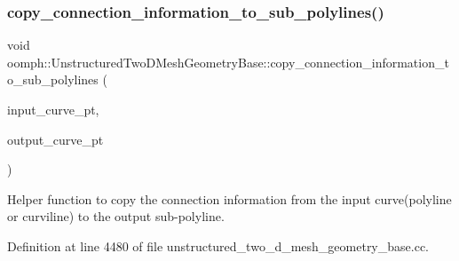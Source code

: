 \subsubsection{\texorpdfstring{copy\+\_\+connection\+\_\+information\+\_\+to\+\_\+sub\+\_\+polylines()}{copy\_connection\_information\_to\_sub\_polylines()}}
{\footnotesize\ttfamily void oomph\+::\+Unstructured\+Two\+D\+Mesh\+Geometry\+Base\+::copy\+\_\+connection\+\_\+information\+\_\+to\+\_\+sub\+\_\+polylines (\begin{DoxyParamCaption}\item[{\hyperlink{classoomph_1_1TriangleMeshCurveSection}{Triangle\+Mesh\+Curve\+Section} $\ast$}]{input\+\_\+curve\+\_\+pt,  }\item[{\hyperlink{classoomph_1_1TriangleMeshCurveSection}{Triangle\+Mesh\+Curve\+Section} $\ast$}]{output\+\_\+curve\+\_\+pt }\end{DoxyParamCaption})\hspace{0.3cm}{\ttfamily [protected]}}



Helper function to copy the connection information from the input curve(polyline or curviline) to the output sub-\/polyline. 



Definition at line 4480 of file unstructured\+\_\+two\+\_\+d\+\_\+mesh\+\_\+geometry\+\_\+base.\+cc.




